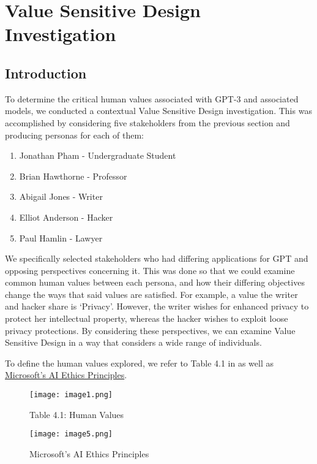 \newpage
\section{Value Sensitive Design Investigation}

\subsection{Introduction}

To determine the critical human values associated with GPT-3 and associated models, we conducted a contextual Value Sensitive Design investigation. This was accomplished by considering five stakeholders from the previous section and producing personas for each of them:

\begin{enumerate}
\item Jonathan Pham - Undergraduate Student
\item Brian Hawthorne - Professor
\item Abigail Jones - Writer
\item Elliot Anderson - Hacker
\item Paul Hamlin - Lawyer
\end{enumerate}

We specifically selected stakeholders who had differing applications for GPT and opposing perspectives concerning it. This was done so that we could examine common human values between each persona, and how their differing objectives change the ways that said values are satisfied. For example, a value the writer and hacker share is ‘Privacy’. However, the writer wishes for enhanced privacy to protect her intellectual property, whereas the hacker wishes to exploit loose privacy protections. By considering these perspectives, we can examine Value Sensitive Design in a way that considers a wide range of individuals. 

To define the human values explored, we refer to Table 4.1 in \textcite{Friedman2013} as well as \href{https://www.microsoft.com/en-us/ai/principles-and-approach}{Microsoft's AI Ethics Principles}.

\begin{figure}[h]
    \centering
    \texttt{[image: image1.png]}
    \caption{Table 4.1: Human Values}
    \label{fig:image1}
\end{figure}


\begin{figure}[h]
    \centering
    \texttt{[image: image5.png]}
    \caption{Microsoft's AI Ethics Principles}
    \label{fig:image5}
\end{figure}

